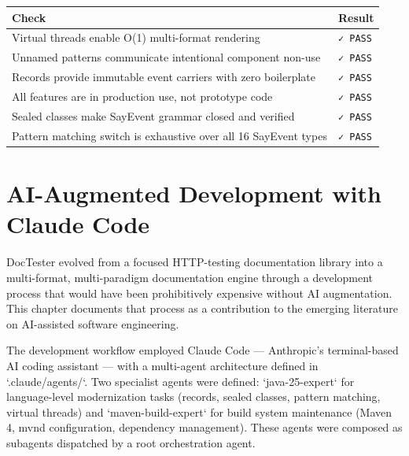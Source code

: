 \documentclass[11pt]{article}
\begin{document}
\begin{table}[h]
\centering
\begin{tabular}{|l|l|}
\hline
\textbf{Check} & \textbf{Result} \\
\hline
Virtual threads enable O(1) multi-format rendering & \texttt{✓ PASS} \\
Unnamed patterns communicate intentional component non-use & \texttt{✓ PASS} \\
Records provide immutable event carriers with zero boilerplate & \texttt{✓ PASS} \\
All features are in production use, not prototype code & \texttt{✓ PASS} \\
Sealed classes make SayEvent grammar closed and verified & \texttt{✓ PASS} \\
Pattern matching switch is exhaustive over all 16 SayEvent types & \texttt{✓ PASS} \\
\hline
\end{tabular}
\end{table}


\section{AI-Augmented Development with Claude Code}

DocTester evolved from a focused HTTP-testing documentation library into a multi-format, multi-paradigm documentation engine through a development process that would have been prohibitively expensive without AI augmentation. This chapter documents that process as a contribution to the emerging literature on AI-assisted software engineering.
\cite{Anthropic2024}

The development workflow employed Claude Code — Anthropic's terminal-based AI coding assistant — with a multi-agent architecture defined in `.claude/agents/`. Two specialist agents were defined: `java-25-expert` for language-level modernization tasks (records, sealed classes, pattern matching, virtual threads) and `maven-build-expert` for build system maintenance (Maven 4, mvnd configuration, dependency management). These agents were composed as subagents dispatched by a root orchestration agent.
\end{document}
